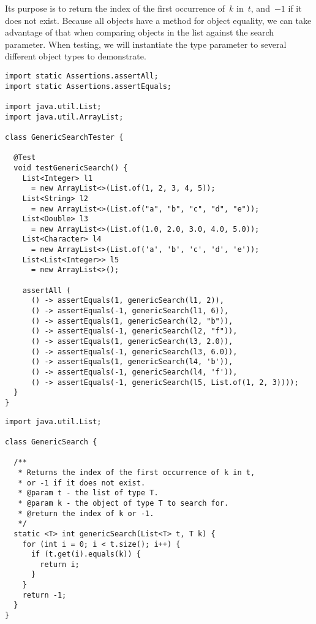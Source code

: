 Its purpose is to return the index of the first occurrence of~$k$ in~$t$, and~$-1$ if it does not exist. 
Because all objects have a  method for object equality, we can take advantage of that when comparing objects in the list against the search parameter. 
When testing, we will instantiate the type parameter to several different object types to demonstrate.

\begin{lstlisting}[language=MyJava]
import static Assertions.assertAll;
import static Assertions.assertEquals;

import java.util.List;
import java.util.ArrayList;

class GenericSearchTester {

  @Test 
  void testGenericSearch() {
    List<Integer> l1 
      = new ArrayList<>(List.of(1, 2, 3, 4, 5));
    List<String> l2 
      = new ArrayList<>(List.of("a", "b", "c", "d", "e"));
    List<Double> l3 
      = new ArrayList<>(List.of(1.0, 2.0, 3.0, 4.0, 5.0));
    List<Character> l4 
      = new ArrayList<>(List.of('a', 'b', 'c', 'd', 'e'));
    List<List<Integer>> l5 
      = new ArrayList<>();

    assertAll (
      () -> assertEquals(1, genericSearch(l1, 2)),
      () -> assertEquals(-1, genericSearch(l1, 6)),
      () -> assertEquals(1, genericSearch(l2, "b")),
      () -> assertEquals(-1, genericSearch(l2, "f")),
      () -> assertEquals(1, genericSearch(l3, 2.0)),
      () -> assertEquals(-1, genericSearch(l3, 6.0)),
      () -> assertEquals(1, genericSearch(l4, 'b')),
      () -> assertEquals(-1, genericSearch(l4, 'f')),
      () -> assertEquals(-1, genericSearch(l5, List.of(1, 2, 3))));
  }
}
\end{lstlisting}

\begin{lstlisting}[language=MyJava]
import java.util.List;

class GenericSearch {

  /**
   * Returns the index of the first occurrence of k in t, 
   * or -1 if it does not exist.
   * @param t - the list of type T.
   * @param k - the object of type T to search for.
   * @return the index of k or -1.
   */
  static <T> int genericSearch(List<T> t, T k) {
    for (int i = 0; i < t.size(); i++) {
      if (t.get(i).equals(k)) { 
        return i; 
      }
    }
    return -1;
  }
}
\end{lstlisting}

